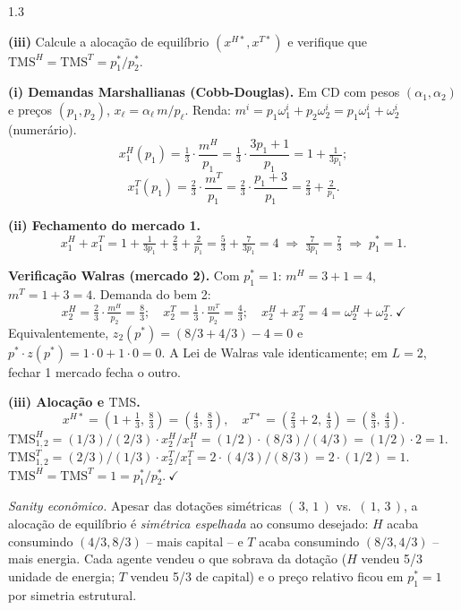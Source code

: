 \documentclass[11pt,addpoints]{exam}
\newcommand{\TMS}{\text{TMS}}
\begin{document}
\begin{spacing}{1.3}
\begin{questions}
\begin{parts}
\textbf{(iii)} Calcule a alocação de equilíbrio $(x^{H*}, x^{T*})$ e verifique que $\TMS^H = \TMS^T = p_1^*/p_2^*$.

\begin{solution}
\textbf{(i) Demandas Marshallianas (Cobb-Douglas).} Em CD com pesos $(\alpha_1, \alpha_2)$ e preços $(p_1, p_2)$, $x_\ell = \alpha_\ell\, m/p_\ell$. Renda: $m^i = p_1 \omega^i_1 + p_2 \omega^i_2 = p_1 \omega^i_1 + \omega^i_2$ (numerário).
\[
    x^H_1(p_1) = \tfrac{1}{3}\cdot \frac{m^H}{p_1} = \tfrac{1}{3}\cdot \frac{3 p_1 + 1}{p_1} = 1 + \tfrac{1}{3 p_1};
\]
\[
    x^T_1(p_1) = \tfrac{2}{3}\cdot \frac{m^T}{p_1} = \tfrac{2}{3}\cdot \frac{p_1 + 3}{p_1} = \tfrac{2}{3} + \tfrac{2}{p_1}.
\]

\textbf{(ii) Fechamento do mercado 1.}
\[
    x^H_1 + x^T_1 = 1 + \tfrac{1}{3 p_1} + \tfrac{2}{3} + \tfrac{2}{p_1} = \tfrac{5}{3} + \tfrac{7}{3 p_1} = 4
    \;\Longrightarrow\; \tfrac{7}{3 p_1} = \tfrac{7}{3}
    \;\Longrightarrow\; \boxed{p_1^* = 1.}
\]

\textbf{Verificação Walras (mercado 2).} Com $p_1^* = 1$: $m^H = 3 + 1 = 4$, $m^T = 1 + 3 = 4$. Demanda do bem 2:
\[
    x^H_2 = \tfrac{2}{3}\cdot \tfrac{m^H}{p_2} = \tfrac{8}{3};\quad x^T_2 = \tfrac{1}{3}\cdot \tfrac{m^T}{p_2} = \tfrac{4}{3};\quad x^H_2 + x^T_2 = 4 = \omega^H_2 + \omega^T_2.\ \checkmark
\]
Equivalentemente, $z_2(p^*) = (8/3 + 4/3) - 4 = 0$ e $p^* \cdot z(p^*) = 1\cdot 0 + 1\cdot 0 = 0$. A Lei de Walras vale identicamente; em $L = 2$, fechar 1 mercado fecha o outro.

\textbf{(iii) Alocação e $\TMS$.}
\[
    x^{H*} = \left(1 + \tfrac{1}{3},\, \tfrac{8}{3}\right) = \left(\tfrac{4}{3},\, \tfrac{8}{3}\right),\quad
    x^{T*} = \left(\tfrac{2}{3} + 2,\, \tfrac{4}{3}\right) = \left(\tfrac{8}{3},\, \tfrac{4}{3}\right).
\]
$\TMS^H_{1,2} = (1/3)/(2/3) \cdot x^H_2/x^H_1 = (1/2)\cdot (8/3)/(4/3) = (1/2)\cdot 2 = 1$.
$\TMS^T_{1,2} = (2/3)/(1/3)\cdot x^T_2/x^T_1 = 2\cdot (4/3)/(8/3) = 2\cdot (1/2) = 1$.
$\TMS^H = \TMS^T = 1 = p_1^*/p_2^*.\ \checkmark$

\textit{Sanity econômico.} Apesar das dotações simétricas $(\,3,\,1\,)$ vs.\ $(\,1,\,3\,)$, a alocação de equilíbrio é \emph{simétrica espelhada} ao consumo desejado: $H$ acaba consumindo $(4/3, 8/3)$ -- mais capital -- e $T$ acaba consumindo $(8/3, 4/3)$ -- mais energia. Cada agente vendeu o que sobrava da dotação ($H$ vendeu 5/3 unidade de energia; $T$ vendeu 5/3 de capital) e o preço relativo ficou em $p_1^* = 1$ por simetria estrutural.
\end{solution}


\end{parts}
\end{questions}
\end{spacing}
\end{document}
